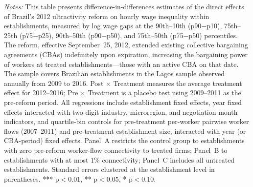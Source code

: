 \documentclass[12pt,letterpaper]{article}
\begin{document}
\begin{table}[]
\begin{threeparttable}
\begin{tablenotes}
\item \textit{Notes:} This table presents difference-in-differences estimates of the direct effects of Brazil's 2012 ultractivity reform on hourly wage inequality within establishments, measured by log wage gaps at the 90th--10th (p90$-$p10), 75th--25th (p75$-$p25), 90th--50th (p90$-$p50), and 75th--50th (p75$-$p50) percentiles. The reform, effective September~25, 2012, extended existing collective bargaining agreements (CBAs) indefinitely upon expiration, increasing the bargaining power of workers at treated establishments---those with an active CBA on that date. The sample covers Brazilian establishments in the Lagos sample observed annually from 2009 to 2016. Post $\times$ Treatment measures the average treatment effect for 2012--2016; Pre $\times$ Treatment is a placebo test using 2009--2011 as the pre-reform period. All regressions include establishment fixed effects, year fixed effects interacted with two-digit industry, microregion, and negotiation-month indicators, and quartile-bin controls for pre-treatment per-worker pairwise worker flows (2007--2011) and pre-treatment establishment size, interacted with year (or CBA-period) fixed effects. Panel~A restricts the control group to establishments with zero pre-reform worker-flow connectivity to treated firms; Panel~B to establishments with at most 1\% connectivity; Panel~C includes all untreated establishments. Standard errors clustered at the establishment level in parentheses. *** p$<$0.01, ** p$<$0.05, * p$<$0.10.
\end{tablenotes}
\end{threeparttable}
\end{table}

\clearpage
\end{document}
